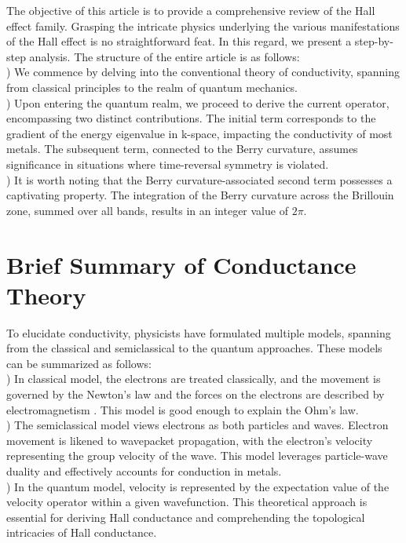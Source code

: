 \documentclass[a4paper]{article}
\begin{document}
\noindent The objective of this article is to provide a comprehensive review of the Hall effect family. Grasping the intricate physics underlying the various manifestations of the Hall effect is no straightforward feat. In this regard, we present a step-by-step analysis. The structure of the entire article is as follows:\\
) We commence by delving into the conventional theory of conductivity, spanning from classical principles to the realm of quantum mechanics.\\
) Upon entering the quantum realm, we proceed to derive the current operator, encompassing two distinct contributions. The initial term corresponds to the gradient of the energy eigenvalue in k-space, impacting the conductivity of most metals. The subsequent term, connected to the Berry curvature, assumes significance in situations where time-reversal symmetry is violated.\\
) It is worth noting that the Berry curvature-associated second term possesses a captivating property. The integration of the Berry curvature across the Brillouin zone, summed over all bands, results in an integer value of $2\pi$.\\
\section{Brief Summary of Conductance Theory}
\noindent To elucidate conductivity, physicists have formulated multiple models, spanning from the classical and semiclassical to the quantum approaches. These models can be summarized as follows:\\
) In classical model, the electrons are treated classically, and the movement is governed by the Newton's law and the forces on the electrons are described by electromagnetism . This model is good enough to explain the Ohm's law.\\
) The semiclassical model views electrons as both particles and waves. Electron movement is likened to wavepacket propagation, with the electron's velocity representing the group velocity of the wave. This model leverages particle-wave duality and effectively accounts for conduction in metals.\\
) In the quantum model, velocity is represented by the expectation value of the velocity operator within a given wavefunction. This theoretical approach is essential for deriving Hall conductance and comprehending the topological intricacies of Hall conductance.\\
\end{document}
